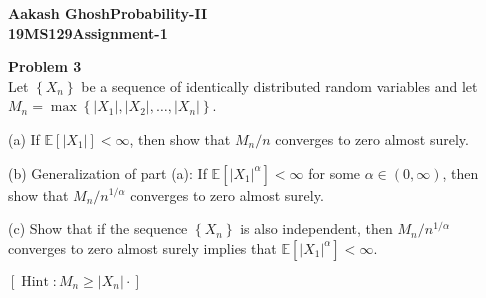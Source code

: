 \documentclass[a4paper, 11pt]{book}
\newenvironment{problem}[2][Problem]
    { \begin{mdframed}[backgroundcolor=blue!20] \textbf{#1 #2} \\}
    {  \end{mdframed}}
\begin{document}
\noindent
\textbf{Aakash Ghosh\hfill Probability-II\\
19MS129\hfill Assignment-1\\}



\begin{problem}{3}
    Let $\left\{X_{n}\right\}$ be a sequence of identically distributed random variables and let\\ $M_{n}=\max \left\{\left|X_{1}\right|,\left|X_{2}\right|, \hdots,\left|X_{n}\right|\right\}$.

    (a) If $\mathbb{E}\left[\left|X_{1}\right|\right]<\infty$, then show that $M_{n} / n$ converges to zero almost surely.

    (b) Generalization of part (a): If $\mathbb{E}\left[\left|X_{1}\right|^{\alpha}\right]<\infty$ for some $\alpha \in(0, \infty)$, then show that $M_{n} / n^{1 / \alpha}$ converges to zero almost surely.
    
    (c) Show that if the sequence $\left\{X_{n}\right\}$ is also independent, then $M_{n} / n^{1 / \alpha}$ converges to zero almost surely implies that $\mathbb{E}\left[\left|X_{1}\right|^{\alpha}\right]<\infty$.
    
    $\left[\operatorname{Hint}: M_{n} \geq\left|X_{n}\right| \cdot\right]$    
\end{problem}
\end{document}
